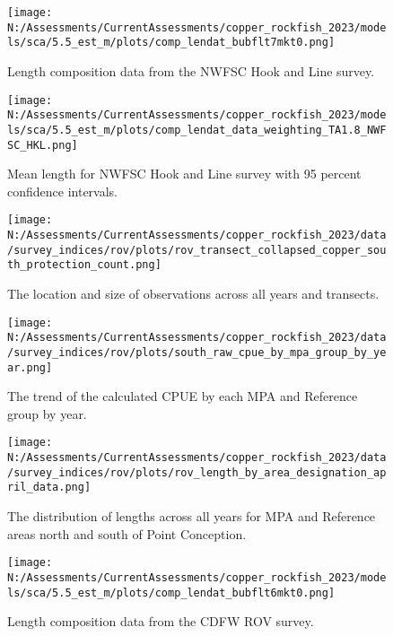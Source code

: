 \documentclass[11pt,
  english,
  letterpaper,
]{article}
\begin{document}
\begin{figure}
\centering
\texttt{[image: N:/Assessments/CurrentAssessments/copper\_rockfish\_2023/models/sca/5.5\_est\_m/plots/comp\_lendat\_bubflt7mkt0.png]}
\caption{Length composition data from the NWFSC Hook and Line survey.\label{fig:hkl-len-data}}
\end{figure}

\begin{figure}
\centering
\texttt{[image: N:/Assessments/CurrentAssessments/copper\_rockfish\_2023/models/sca/5.5\_est\_m/plots/comp\_lendat\_data\_weighting\_TA1.8\_NWFSC\_HKL.png]}
\caption{Mean length for NWFSC Hook and Line survey with 95 percent confidence intervals.\label{fig:mean-hkl-len-data}}
\end{figure}

\begin{figure}
\centering
\texttt{[image: N:/Assessments/CurrentAssessments/copper\_rockfish\_2023/data/survey\_indices/rov/plots/rov\_transect\_collapsed\_copper\_south\_protection\_count.png]}
\caption{The location and size of observations across all years and transects.\label{fig:rov-obs-loc}}
\end{figure}

\begin{figure}
\centering
\texttt{[image: N:/Assessments/CurrentAssessments/copper\_rockfish\_2023/data/survey\_indices/rov/plots/south\_raw\_cpue\_by\_mpa\_group\_by\_year.png]}
\caption{The trend of the calculated CPUE by each MPA and Reference group by year.\label{fig:rov-raw-cpue}}
\end{figure}

\begin{figure}
\centering
\texttt{[image: N:/Assessments/CurrentAssessments/copper\_rockfish\_2023/data/survey\_indices/rov/plots/rov\_length\_by\_area\_designation\_april\_data.png]}
\caption{The distribution of lengths across all years for MPA and Reference areas north and south of Point Conception.\label{fig:rov-len}}
\end{figure}

\begin{figure}
\centering
\texttt{[image: N:/Assessments/CurrentAssessments/copper\_rockfish\_2023/models/sca/5.5\_est\_m/plots/comp\_lendat\_bubflt6mkt0.png]}
\caption{Length composition data from the CDFW ROV survey.\label{fig:rov-len-data}}
\end{figure}
\end{document}
